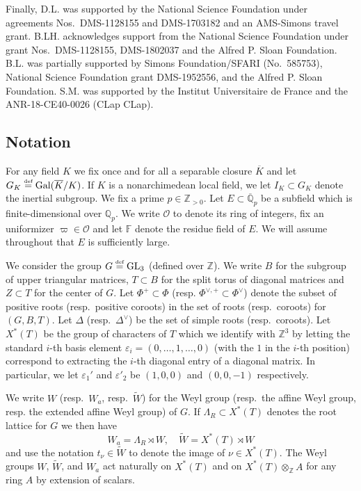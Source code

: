 \documentclass[oneside,a4paper,english, 11pt]{amsart}
\theoremstyle{plain}
\theoremstyle{plain}
\theoremstyle{plain}
\theoremstyle{plain}
\theoremstyle{plain}
\theoremstyle{plain}
\theoremstyle{definition}
\theoremstyle{definition}
\theoremstyle{definition}
\theoremstyle{remark}
\numberwithin{equation}{section}
\newcommand{\Z}{\mathbb{Z}}
\newcommand{\Q}{\mathbb{Q}}
\newcommand{\F}{\mathbb{F}}
\newcommand{\cO}{\mathcal{O}}
\newcommand{\eps}{\varepsilon}
\newcommand{\Gal}{\mathrm{Gal}}
\newcommand{\GL}{\mathrm{GL}}
\newcommand{\tld}[1]{\widetilde{#1}}
\newcommand{\defeq}{\stackrel{\textrm{\tiny{def}}}{=}}
\newcommand{\ovl}[1]{\overline{#1}}
\begin{document}
%

Finally, D.L. was supported by the National Science Foundation under agreements Nos.~DMS-1128155 and DMS-1703182 and an AMS-Simons travel grant. B.LH. acknowledges support from the National Science Foundation under grant Nos.~DMS-1128155, DMS-1802037 and the Alfred P. Sloan Foundation. B.L. was partially supported by Simons Foundation/SFARI (No.~585753), National Science Foundation grant DMS-1952556, and the Alfred P. Sloan Foundation. S.M. was supported by the Institut Universitaire de France and the ANR-18-CE40-0026 (CLap CLap).


\subsection{Notation}
\label{subsec:notations}

For any field $K$ we fix once and for all a separable closure $\ovl{K}$ and let $G_K \defeq \Gal(\ovl{K}/K)$. 
%
If $K$ is a nonarchimedean local field, we let $I_K \subset G_K$ denote the inertial subgroup.
%
We fix a prime $p\in\Z_{>0}$.
Let $E \subset \ovl{\Q}_p$ be a subfield which is finite-dimensional over $\Q_p$.
We write $\cO$ to denote its ring of integers, fix an uniformizer $\varpi\in \cO$ and let $\F$ denote the residue field of $E$.
We will assume throughout that $E$ is sufficiently large.

We consider the group $G\defeq\GL_3$ (defined over $\Z$).
We write $B$ for the subgroup of upper triangular matrices, $T \subset B$ for the split torus of diagonal matrices and $Z \subset T$ for the center of $G$.  
Let $\Phi^{+} \subset \Phi$ (resp. $\Phi^{\vee, +} \subset \Phi^{\vee}$) denote the subset of positive roots (resp.~positive coroots) in the set of roots (resp.~coroots) for $(G, B, T)$. 
Let $\Delta$ (resp.~$\Delta^{\vee}$) be the set of simple roots (resp.~coroots).
Let $X^*(T)$ be the group of characters of $T$ which we identify with $\Z^3$ by letting the standard $i$-th basis element $\eps_i=(0,\ldots, 1,\ldots, 0)$ (with the $1$ in the $i$-th position)  correspond to extracting the $i$-th diagonal entry of a diagonal matrix. 
In particular, we let $\eps_1'$ and $\eps'_2$ be $(1,0,0)$ and $(0,0,-1)$ respectively.


We write $W$ (resp.~$W_a$, resp.~$\tld{W}$) for the Weyl group (resp.~the affine Weyl group, resp. the extended affine Weyl group) of $G$.
If $\Lambda_R \subset X^*(T)$ denotes the root lattice for $G$ we then have
\[
W_a = \Lambda_R \rtimes W, \quad \tld{W} = X^*(T) \rtimes W
\]
and use the notation $t_{\nu} \in \tld{W}$ to denote the image of $\nu \in X^*(T)$. 
The Weyl groups $W$, $\tld{W}$, and $W_a$ act naturally on $X^*(T)$ and on $X^*(T)\otimes_{\Z} A$ for any ring $A$ by extension of scalars.
\end{document}
